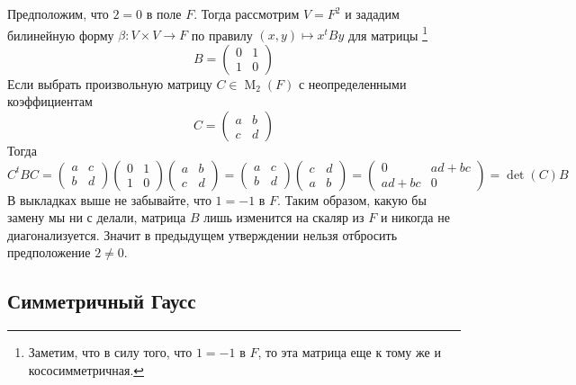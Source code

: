 Предположим, что $2 = 0$ в поле $F$.
Тогда рассмотрим $V = F^2$ и зададим билинейную форму $\beta\colon V\times V\to F$ по правилу $(x,y)\mapsto x^t By$ для матрицы%
\footnote{Заметим, что в силу того, что $1 = -1$ в $F$, то эта матрица еще к тому же и кососимметричная.}
\[
B = 
\begin{pmatrix}
{0}&{1}\\
{1}&{0}
\end{pmatrix}
\]
Если выбрать произвольную матрицу $C \in \operatorname{M}_2(F)$ с неопределенными коэффициентам
\[
C = 
\begin{pmatrix}
{a}&{b}\\
{c}&{d}
\end{pmatrix}
\]
Тогда
\[
C^t B C = 
\begin{pmatrix}
{a}&{c}\\
{b}&{d}
\end{pmatrix}
\begin{pmatrix}
{0}&{1}\\
{1}&{0}
\end{pmatrix}
\begin{pmatrix}
{a}&{b}\\
{c}&{d}
\end{pmatrix}
=
\begin{pmatrix}
{a}&{c}\\
{b}&{d}
\end{pmatrix}
\begin{pmatrix}
{c}&{d}\\
{a}&{b}
\end{pmatrix}
=
\begin{pmatrix}
{0}&{ad + bc}\\
{ad +  bc}&{0}
\end{pmatrix}
=
\det(C)B
\]
В выкладках выше не забывайте, что $1 = -1$ в $F$.
Таким образом, какую бы замену мы ни с делали, матрица $B$ лишь изменится на скаляр из $F$ и никогда не диагонализуется.
Значит в предыдущем утверждении нельзя отбросить предположение $2 \neq 0$.


\subsection{Симметричный Гаусс}

